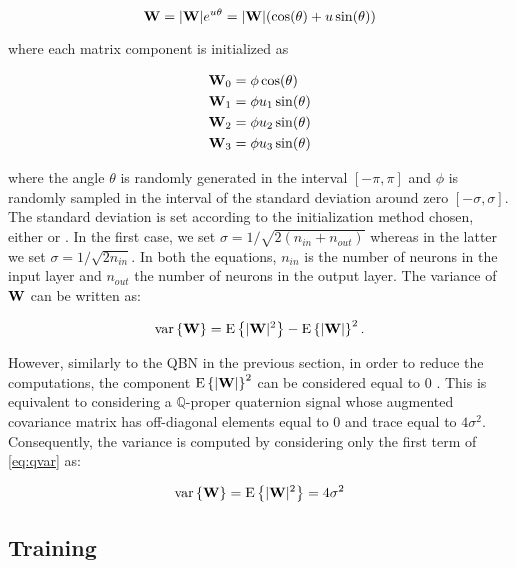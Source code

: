 \documentclass[graybox]{svmult}
\begin{document}
\begin{equation}
    {\mathbf W} = |{\mathbf W}|e^{u \theta} = |{\mathbf W}|(\cos(\theta) + u \sin(\theta))
\end{equation}

\noindent where each matrix component is initialized as

\begin{equation}
    \begin{split}
        {\mathbf W}_0 &= \phi \cos(\theta) \\
        {\mathbf W}_1 &= \phi u_1 \sin(\theta) \\
        {\mathbf W}_2 &= \phi u_2 \sin(\theta) \\
        {\mathbf W}_3 &= \phi u_3 \sin(\theta)
    \end{split}
\end{equation}

\noindent where the angle $\theta$ is randomly generated in the interval $[-\pi, \pi]$ and $\phi$ is randomly sampled in the interval of the standard deviation around zero $[-\sigma, \sigma]$. The standard deviation is set according to the initialization method chosen, either \cite{GlorotInit2010} or \cite{HeInit2015}. In the first case, we set $\sigma = 1/\sqrt{2(n_{in} + n_{out})}$ whereas in the latter we set $\sigma = 1/\sqrt{2 n_{in}}$. In both the equations, $n_{in}$ is the number of neurons in the input layer and $n_{out}$ the number of neurons in the output layer. The variance of ${\mathbf W}$ can be written as:

\begin{equation}
    \operatorname{var}\left\{{\mathbf W}\right\} = \text{E}\left\{|{\mathbf W}|^2\right\} - \text{E}\left\{|{\mathbf W}|\right\}^2.
\label{eq:qvar}
\end{equation}

However, similarly to the QBN in the previous section, in order to reduce the computations, the component $\text{E}\left\{|{\mathbf W}|\right\}^2$ can be considered equal to $0$ \cite{ParcolletICLR2019, ParcolletAIR2019}. This is equivalent to considering a $\mathbb{Q}$-proper quaternion signal whose augmented covariance matrix has off-diagonal elements equal to $0$ and trace equal to $4\sigma^2$. Consequently, the variance is computed by considering only the first term of \eqref{eq:qvar} as:

\begin{equation}
    \operatorname{var}\left\{{\mathbf W}\right\} = \text{E}\left\{|{\mathbf W}|^2\right\} = 4\sigma^2
\end{equation}

\subsection{Training}
\end{document}
